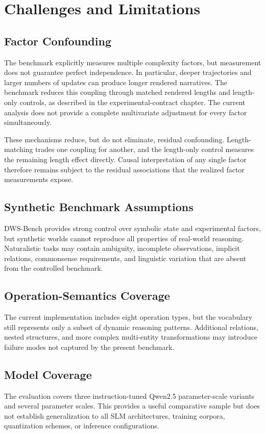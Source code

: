 \documentclass{iutbscthesis}
\begin{document}
\chapter{Challenges and Limitations}
\section{Factor Confounding}
The benchmark explicitly measures multiple complexity factors, but measurement does not guarantee
perfect independence. In particular, deeper trajectories and larger numbers of updates can produce
longer rendered narratives. The benchmark reduces this coupling through matched rendered lengths and
length-only controls, as described in the experimental-contract chapter. The current analysis does not
provide a complete multivariate adjustment for every factor simultaneously.

These mechanisms reduce, but do not eliminate, residual confounding. Length-matching trades one
coupling for another, and the length-only control measures the remaining length effect directly.
Causal interpretation of any single factor therefore remains subject to the residual associations
that the realized factor measurements expose.


\section{Synthetic Benchmark Assumptions}
DWS-Bench provides strong control over symbolic state and experimental factors, but synthetic worlds
cannot reproduce all properties of real-world reasoning. Naturalistic tasks may contain ambiguity,
incomplete observations, implicit relations, commonsense requirements, and linguistic variation that
are absent from the controlled benchmark.

\section{Operation-Semantics Coverage}
The current implementation includes eight operation types, but the vocabulary still represents only a
subset of dynamic reasoning patterns. Additional relations, nested structures, and more complex
multi-entity transformations may introduce failure modes not captured by the present benchmark.

\section{Model Coverage}
The evaluation covers three instruction-tuned Qwen2.5 parameter-scale variants and several parameter
scales. This provides a useful comparative sample but does not establish generalization to all SLM
architectures, training corpora, quantization schemes, or inference configurations.
\end{document}
